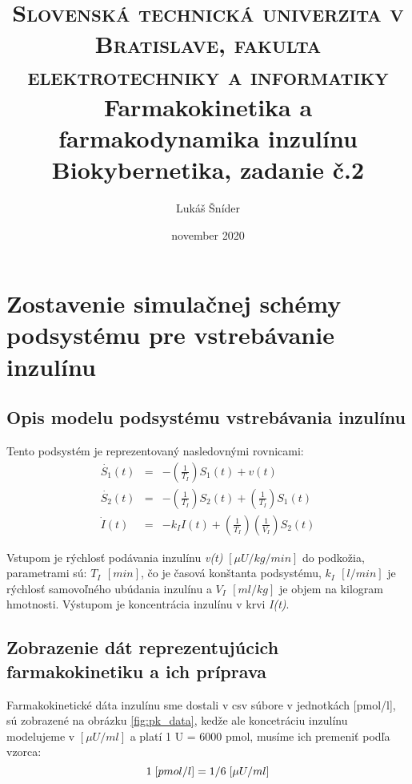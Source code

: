\documentclass[11pt]{article} %
\title{	
	\normalfont\normalsize
	\textsc{Slovenská technická univerzita v Bratislave, fakulta elektrotechniky a informatiky}\\ %
	\vspace{25pt} %
	\vspace{20pt} %
	\vspace{20pt} %
	\vspace{20pt} %
	\vspace{20pt} %
	\vspace{20pt} %
	\vspace{20pt} %
	\vspace{20pt} %
	\vspace{20pt} %
		\vspace{20pt} %
	\vspace{20pt} %
	\huge Farmakokinetika a farmakodynamika inzulínu\\ %
	\vspace{12pt} %
	\normalsize Biokybernetika, zadanie č.2
	\vspace{20pt} %
	\vspace{20pt} %
	\vspace{20pt} %
		\vspace{20pt} %
	\vspace{20pt} %
		\vspace{20pt} %
	\vspace{20pt} %
		\vspace{20pt} %
	\vspace{20pt} %
	\vspace{20pt} %
	\vspace{20pt} %
		\vspace{20pt} %
	\vspace{20pt} %
	\vspace{12pt} %
}
\author{\LARGE Lukáš Šníder} %
\date{november 2020}
\begin{document}
\maketitle %
\thispagestyle{empty}
\clearpage
\setcounter{page}{1}

\section{Zostavenie simulačnej schémy podsystému pre vstrebávanie inzulínu}

\subsection{Opis modelu podsystému vstrebávania inzulínu}

Tento podsystém je reprezentovaný nasledovnými rovnicami:
\begin{eqnarray}
	\dot{S_1}(t) &=& -\left(\frac{1}{T_I}\right) S_1(t) + v(t) \\ 
	\dot{S_2}(t) &=& -\left(\frac{1}{T_I}\right)S_2(t) + \left(\frac{1}{T_I}\right)S_1(t) \\
	\dot{I}(t) &=& -{k_I}I(t) + \left(\frac{1}{T_I}\right)\left(\frac{1}{V_I}\right)S_2(t) 
\end{eqnarray}

Vstupom je rýchlosť podávania inzulínu \textit{v(t)} $[\mu U/kg/min]$ do podkožia, parametrami sú: \textbf{$T_I$ $[min]$}, čo je časová konštanta podsystému, \textbf{$k_I$ $[l/min]$} je rýchlosť samovoľného ubúdania inzulínu a \textbf{$V_I$ $[ml/kg]$} je objem na kilogram hmotnosti. Výstupom je koncentrácia inzulínu v krvi \textit{I(t)}.

\subsection{Zobrazenie dát reprezentujúcich farmakokinetiku a ich príprava}

Farmakokinetické dáta inzulínu sme dostali v csv súbore v jednotkách [pmol/l], sú zobrazené na obrázku \ref{fig:pk_data}, kedže ale koncetráciu inzulínu modelujeme v $[\mu U/ml]$ a platí 1 U = 6000 pmol, musíme ich premeniť podľa vzorca:
\begin{equation}
1 \hspace{1mm} [pmol/l] = 1/6 \hspace{1mm} [\mu U/ml] 
\end{equation}
\end{document}

